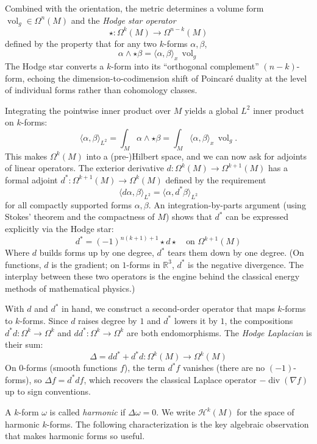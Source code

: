 \documentclass{article}
\newcommand{\R}{\mathbb{R}}
\newcommand{\CH}{\mathcal{H}}
\renewcommand{\div}{{\operatorname{div}}}
\newcommand{\vol}{\operatorname{vol}}
\begin{document}
Combined with the orientation, the metric determines a volume form
$\vol_g \in \Omega^n(M)$ and the \emph{Hodge star operator}
\[
  \star: \Omega^k(M) \longrightarrow \Omega^{n-k}(M)
\]
defined by the property that for any two $k$-forms $\alpha, \beta$,
\[
  \alpha \wedge \star\beta = \langle \alpha, \beta \rangle_x \, \vol_g
\]
The Hodge star converts a $k$-form into its ``orthogonal complement''
$(n-k)$-form, echoing the dimension-to-codimension shift of Poincar\'{e}
duality at the level of individual forms rather than cohomology classes.

Integrating the pointwise inner product over $M$ yields a global $L^2$ inner
product on $k$-forms:
\[
  \langle \alpha, \beta \rangle_{L^2}
    = \int_M \alpha \wedge \star\beta
    = \int_M \langle \alpha, \beta \rangle_x \, \vol_g.
\]
This makes $\Omega^k(M)$ into a (pre-)Hilbert space, and we can now ask for
adjoints of linear operators. The exterior derivative
$d: \Omega^k(M) \to \Omega^{k+1}(M)$ has a formal adjoint
$d^*: \Omega^{k+1}(M) \to \Omega^k(M)$ defined by the requirement
\[
  \langle d\alpha, \beta \rangle_{L^2}
    = \langle \alpha, d^*\beta \rangle_{L^2}
\]
for all compactly supported forms $\alpha, \beta$. An integration-by-parts
argument (using Stokes' theorem and the compactness of $M$) shows that $d^*$
can be expressed explicitly via the Hodge star:
\[
  d^* = (-1)^{n(k+1)+1} \star d \star
  \quad \text{on } \Omega^{k+1}(M)
\]
Where $d$ builds forms up by one degree, $d^*$ tears them down by one degree.
(On functions, $d$ is the gradient; on $1$-forms in $\R^3$, $d^*$ is the
negative divergence. The interplay between these two operators is the engine
behind the classical energy methods of mathematical physics.)

With $d$ and $d^*$ in hand, we construct a second-order operator that maps
$k$-forms to $k$-forms. Since $d$ raises degree by $1$ and $d^*$ lowers it by
$1$, the compositions $d^*d: \Omega^k \to \Omega^k$ and
$dd^*: \Omega^k \to \Omega^k$ are both endomorphisms. The \emph{Hodge
Laplacian} is their sum:
\[
  \Delta = dd^* + d^*d: \Omega^k(M) \longrightarrow \Omega^k(M)
\]
On $0$-forms (smooth functions $f$), the term $d^*f$ vanishes (there are no
$(-1)$-forms), so $\Delta f = d^*df$, which recovers the classical Laplace
operator $-\div(\nabla f)$ up to sign conventions.

A $k$-form $\omega$ is called \emph{harmonic} if $\Delta\omega = 0$. We write
$\CH^k(M)$ for the space of harmonic $k$-forms. The following characterization
is the key algebraic observation that makes harmonic forms so useful.
\end{document}
